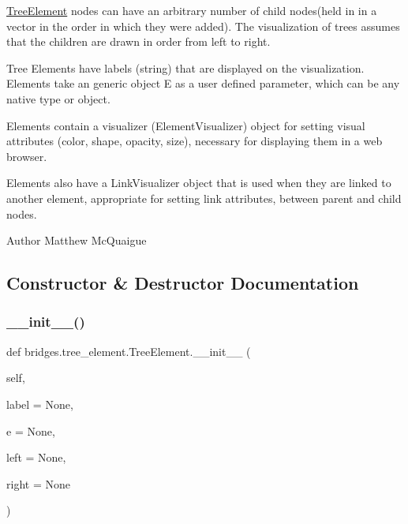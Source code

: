 \mbox{\hyperlink{classbridges_1_1tree__element_1_1_tree_element}{Tree\+Element}} nodes can have an arbitrary number of child nodes(held in in a vector in the order in which they were added). The visualization of trees assumes that the children are drawn in order from left to right.

Tree Elements have labels (string) that are displayed on the visualization. Elements take an generic object E as a user defined parameter, which can be any native type or object.

Elements contain a visualizer (Element\+Visualizer) object for setting visual attributes (color, shape, opacity, size), necessary for displaying them in a web browser.

Elements also have a Link\+Visualizer object that is used when they are linked to another element, appropriate for setting link attributes, between parent and child nodes.

\begin{DoxyAuthor}{Author}
Matthew Mc\+Quaigue 
\end{DoxyAuthor}


\subsection{Constructor \& Destructor Documentation}
\mbox{\label{classbridges_1_1tree__element_1_1_tree_element_aa02dd629714ad2755b2e09123f8fa293}} 
\subsubsection{\texorpdfstring{\+\_\+\+\_\+init\+\_\+\+\_\+()}{\_\_init\_\_()}}
{\footnotesize\ttfamily def bridges.\+tree\+\_\+element.\+Tree\+Element.\+\_\+\+\_\+init\+\_\+\+\_\+ (\begin{DoxyParamCaption}\item[{}]{self,  }\item[{}]{label = {\ttfamily None},  }\item[{}]{e = {\ttfamily None},  }\item[{}]{left = {\ttfamily None},  }\item[{}]{right = {\ttfamily None} }\end{DoxyParamCaption})}



